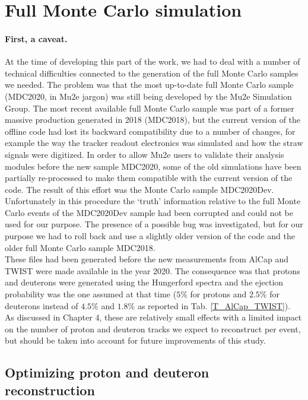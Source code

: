 \documentclass[12pt,a4paper,openright, oneside, titlepage]{book} %
\begin{document}
\section{Full Monte Carlo simulation}

\paragraph{First, a caveat.} 
At the time of developing this part of the work, we had to deal with a number of technical difficulties connected to the generation of the full Monte Carlo samples we needed. 
The problem was that the most up-to-date full Monte Carlo sample (MDC2020, in Mu2e jargon) was still being developed by the Mu2e Simulation Group. 
The most recent available full Monte Carlo sample was part of a former massive production generated in 2018 (MDC2018), but the current version of the offline code had lost its backward compatibility due to a number of changes, for example the way the tracker readout electronics was simulated and how the straw signals were digitized. 
In order to allow Mu2e users to validate their analysis modules before the new sample MDC2020, some of the old simulations have been partially re-processed to make them compatible with the current version of the code. 
The result of this effort was the Monte Carlo sample MDC2020Dev.
Unfortunately in this procedure the `truth' information relative to the full Monte Carlo events of the MDC2020Dev sample had been corrupted and could not be used for our purpose. 
The presence of a possible bug was investigated, but for our purpose we had to roll back and use a slightly older version of the code and the older full Monte Carlo sample MDC2018. \\
These files had been generated before the new measurements from AlCap and TWIST were made available in the year 2020. 
The consequence was that protons and deuterons were generated using the Hungerford spectra and the ejection probability was the one assumed at that time ($5\%$ for protons and $2.5\%$ for deuterons instead of $4.5\%$ and $1.8\%$ as reported in Tab. \ref{T_AlCap_TWIST}). \\
As discussed in Chapter 4, these are relatively small effects with a limited impact on the number of proton and deuteron tracks we expect to reconstruct per event, but should be taken into account for future improvements of this study.


\subsection{Optimizing proton and deuteron reconstruction}
\end{document}
